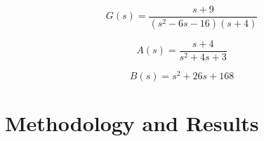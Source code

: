 \documentclass[12pt,a4paper]{article}
\begin{document}
\begin{equation}
    G(s) = \frac{s+9}{(s^2-6s-16)(s+4)}
\end{equation}

\begin{equation}
    A(s) = \frac{s+4}{s^2+4s+3}
\end{equation}

\begin{equation}
    B(s) = s^2+26s+168
\end{equation}

\section{Methodology and Results}\label{sec:meth}
\end{document}
